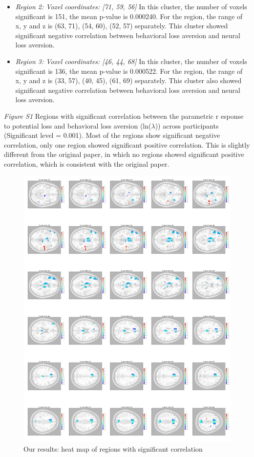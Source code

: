 \documentclass[11pt]{article}
\begin{document}
\begin{itemize}
\item \emph{Region 2: Voxel coordinates: [71, 59, 56]} In this cluster, the 
number of voxels significant is 151, the mean p-value is 0.000240. For the 
region, the range of x, y and z is (63, 71), (54, 60), (52, 57) separately. 
This cluster showed significant negative correlation between behavioral loss 
aversion and neural loss aversion.
\item \emph{Region 3: Voxel coordinates: [46, 44, 68]} In this cluster, the 
number of voxels significant is 136, the mean p-value is 0.000522. For the 
region, the range of x, y and z is (33, 57), (40, 45), (61, 69) separately. 
This cluster also showed significant negative correlation between behavioral 
loss aversion and neural loss aversion.

\end{itemize}

\newpage

\emph{Figure S1} Regions with significant correlation between the parametric r
esponse to potential loss and behavioral loss aversion (ln($\lambda$)) across 
participants (Significant level = 0.001).  Most of the regions show significant 
negative correlation, only one region showed significant positive correlation. 
This is slightly different from the original paper, in which no regions showed 
significant positive correlation, which is consistent with the original paper.

\begin{figure}[H]
    \centering
        \includegraphics[scale=0.1]{figures/Regression3/sig_cor_z_loss.png}
    \caption{Our results: heat map of regions with significant correlation}
\end{figure}
\end{document}
